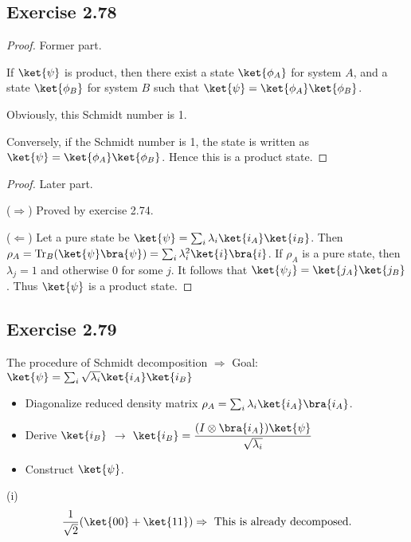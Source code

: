 \documentclass[a4paper,12pt]{article}
\DeclareMathOperator{\Tr}{Tr}
\begin{document}
\subsection*{Exercise 2.78}
\begin{proof}
	Former part.

	If $\ket{\psi}$ is product, then there exist a state $\ket{\phi_A}$ for system $A$, and a state $\ket{\phi_B}$ for system $B$ such that
	$\ket{\psi} = \ket{\phi_A} \ket{\phi_B}$.

	Obviously, this Schmidt number is  1.

	Conversely, if the Schmidt number is 1, the state is written as $\ket{\psi} = \ket{\phi_A} \ket{\phi_B}$.
	Hence this is a product state.
\end{proof}


\begin{proof}
	Later part.

	($\Rightarrow$) Proved by exercise 2.74.

	($\Leftarrow$) Let a pure state be  $\ket{\psi} = \sum_i \lambda_i \ket{i_A} \ket{i_B}$. Then $\rho_A = \Tr_B (\ket{\psi}\bra{\psi}) = \sum_i \lambda_i^2 \ket{i}\bra{i}$.
	If $\rho_A$ is a pure state, then $\lambda_j = 1$ and otherwise 0 for some $j$.
	It follows that  $\ket{\psi_j} = \ket{j_A} \ket{j_B}$. Thus $\ket{\psi}$ is a product state.
\end{proof}


\subsection*{Exercise 2.79}
	The procedure of Schmidt decomposition $\Rightarrow$ Goal: $\ket{\psi} = \sum_{i} \sqrt{\lambda_i} \ket{i_A} \ket{i_B}$

	\begin{itemize}
		\item Diagonalize reduced density matrix $\rho_A = \sum_i \lambda_i \ket{i_A}\bra{i_A}$.
		\item Derive $\ket{i_B}$ $\rightarrow$ $\displaystyle  \ket{i_B} = \frac{(I \otimes \bra{i_A}) \ket{\psi}}{\sqrt{\lambda_i}}$
		\item Construct $\ket{\psi}$.
	\end{itemize}



(i)
\begin{align*}
	\frac{1}{\sqrt{2}} (\ket{00} + \ket{11}) \Rightarrow \text{ This is already decomposed.}
\end{align*}
\end{document}
